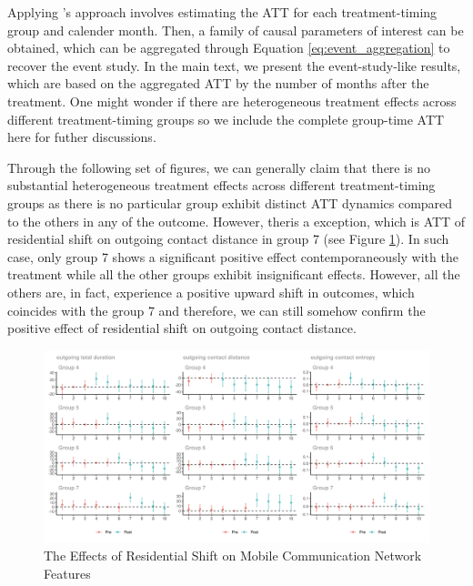 
\label{complete_group_time_att_dynamics}
Applying \cite{callaway2021difference}'s approach involves estimating the ATT for each treatment-timing group and calender month. Then, a family of causal parameters of interest can be obtained, which can be aggregated through Equation \ref{eq:event_aggregation} to recover the event study. In the main text, we present the event-study-like results, which are based on the aggregated ATT by the number of months after the treatment. One might wonder if there are heterogeneous treatment effects across different treatment-timing groups so we include the complete group-time ATT here for futher discussions.

Through the following set of figures, we can generally claim that there is no substantial heterogeneous treatment effects across different treatment-timing groups as there is no particular group exhibit distinct ATT dynamics compared to the others in any of the outcome. However, theris a exception, which is ATT of residential shift on outgoing contact distance in group 7 (see Figure \ref{fig:attgt_residential_shift_mobile_communication_network}). In such case, only group 7 shows a significant positive effect contemporaneously with the treatment while all the other groups exhibit insignificant effects. However, all the others are, in fact, experience a positive upward shift in outcomes, which coincides with the group 7 and therefore, we can still somehow confirm the positive effect of residential shift on outgoing contact distance.

\clearpage\newpage
\begin{figure}[ht!]
\centering
\caption{The Effects of Residential Shift on Mobile Communication Network Features}


\includegraphics[width=1.5\textwidth, angle=90]{figures/csdid/cohort_specific_ATT_dynamics/residential_shift_mobile_communication_network.png}

\label{fig:attgt_residential_shift_mobile_communication_network}
\end{figure}



